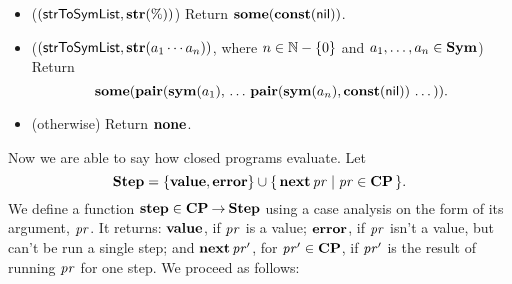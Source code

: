 \begin{itemize}
\item ($(\mathsf{strToSymList}, \mathbf{str}(\%))$)
  Return $\mathbf{some}(\mathbf{const}(\mathsf{nil}))$.

\item ($(\mathsf{strToSymList}, \mathbf{str}(a_1\cdots a_n))$,
  where $n\in\mathbb{N}-\{0\}$ and $a_1,\ldots,a_n\in\mathbf{Sym}$)
  Return
  \begin{displaymath}
    \mathbf{some}(\mathbf{pair}(\mathbf{sym}(a_1),\, \ldots\, \mathbf{pair}(\mathbf{sym}(a_n),
    \mathbf{const}(\mathsf{nil}))\,\ldots\,)) .
  \end{displaymath}

\item (otherwise) Return $\mathbf{none}$.
\end{itemize}

%
%
%
%
%
Now we are able to say how closed programs evaluate.  Let
\begin{displaymath}
  \mathbf{Step} = \{\mathbf{value}, \mathbf{error}\} \cup
  \{ \, \mathbf{next}\,\mathit{pr} \mid \mathit{pr}\in\mathbf{CP} \, \} .
\end{displaymath}
We define a function $\mathbf{step}\in\mathbf{CP}\mathbin{\to}\mathbf{Step}$ using a case analysis
on the form of its argument, $\mathit{pr}$.  It returns: $\mathbf{value}$, if
$\mathit{pr}$ is a value; $\mathbf{error}$, if $\mathit{pr}$ isn't a value, but can't be
run a single step; and $\mathbf{next}\,\mathit{pr}'$, for $\mathit{pr}'\in\mathbf{CP}$, if
$\mathit{pr}'$ is the result of running $\mathit{pr}$ for one step.
We proceed as follows:
